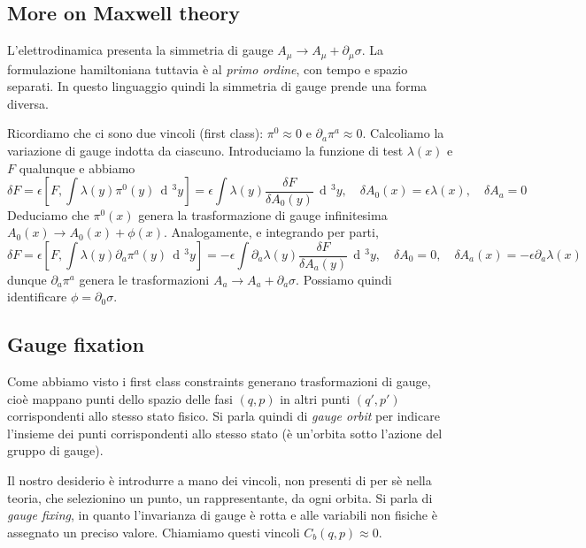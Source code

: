 \documentclass[a4paper, 11pt]{article}
\newcommand{\dd}{\mathop{\mathrm{d}\!}{}}
\begin{document}
	\subsection{More on Maxwell theory}
	L'elettrodinamica presenta la simmetria di gauge $A_\mu\rightarrow A_\mu + \partial_\mu \sigma$. La formulazione hamiltoniana tuttavia è al \emph{primo ordine}, con tempo e spazio separati. In questo linguaggio quindi la simmetria di gauge prende una forma diversa.
	
	Ricordiamo che ci sono due vincoli (first class): $\pi^0\approx 0$ e $\partial_a \pi^a \approx 0$. Calcoliamo la variazione di gauge indotta da ciascuno. Introduciamo la funzione di test $\lambda(x)$ e $F$ qualunque e abbiamo
	\[ \delta F = \epsilon \left[F, \int \lambda(y) \pi^0(y)\,\dd^3y\right] = \epsilon \int \lambda(y) \dfrac{\delta F}{\delta A_0(y)}\,\dd^3 y ,\quad \delta A_0(x) = \epsilon \lambda(x),\quad \delta A_a = 0\]
	Deduciamo che $\pi^0(x)$ genera la trasformazione di gauge infinitesima $A_0(x)\rightarrow A_0(x) + \phi(x)$. Analogamente, e integrando per parti,
	\[ \delta F = \epsilon \left[ F, \int \lambda(y) \partial_a \pi^a(y)\, \dd^3 y \right] = -\epsilon \int \partial_a \lambda (y) \dfrac{\delta F}{\delta A_a(y)}\, \dd^3 y,\quad \delta A_0 = 0,\quad \delta A_a(x) = - \epsilon \partial_a \lambda(x) \]
	dunque $\partial_a \pi^a$ genera le trasformazioni $A_a\rightarrow A_a + \partial_a \sigma$.
	Possiamo quindi identificare $\phi = \partial_0 \sigma$.
	
	\subsection{Gauge fixation}
	Come abbiamo visto i first class constraints generano trasformazioni di gauge, cioè mappano punti dello spazio delle fasi $(q,p)$ in altri punti $(q',p')$ corrispondenti allo stesso stato fisico. Si parla quindi di \emph{gauge orbit} per indicare l'insieme dei punti corrispondenti allo stesso stato (è un'orbita sotto l'azione del gruppo di gauge).
	
	Il nostro desiderio è introdurre a mano dei vincoli, non presenti di per sè nella teoria, che selezionino un punto, un rappresentante, da ogni orbita. Si parla di \emph{gauge fixing}, in quanto l'invarianza di gauge è rotta e alle variabili non fisiche è assegnato un preciso valore. Chiamiamo questi vincoli $C_b(q,p)\approx0$.
	
\end{document}
